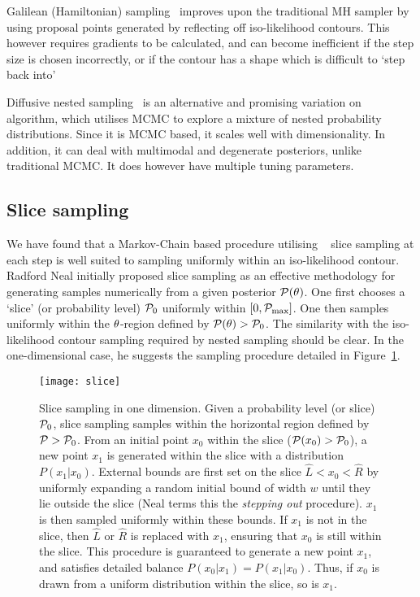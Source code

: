 Galilean (Hamiltonian) sampling~\citep{GalileanNestedSampling,Betancourt2011} improves upon the traditional MH sampler by using proposal points generated by reflecting off iso-likelihood contours. This however requires gradients to be calculated, and can become inefficient if the step size is chosen incorrectly, or if the contour has a shape which is difficult to `step back into'

Diffusive nested sampling~\citep{DiffusiveNestedSampling} is an alternative and promising variation on~ algorithm, which utilises MCMC to explore a mixture of nested probability distributions. Since it is MCMC based, it scales well with dimensionality. In addition, it can deal with multimodal and degenerate posteriors, unlike traditional MCMC\@. It does however have multiple tuning parameters.


\subsection{Slice sampling}
\label{sec:pc:slice_sampling}
We have found that a Markov-Chain based procedure utilising ~ slice sampling at each step is well suited to sampling uniformly within an iso-likelihood contour.
Radford Neal initially proposed slice sampling as an effective methodology for generating samples numerically from a given posterior $\mathcal{P}(\theta)$. One first chooses a `slice' (or probability level) $\mathcal{P}_0$ uniformly within $[0,\mathcal{P}_{\mathrm{max}}]$. One then samples uniformly within the $\theta$-region defined by $\mathcal{P}(\theta)>\mathcal{P}_0$. The similarity with the iso-likelihood contour sampling required by nested sampling should be clear. In the one-dimensional case, he suggests the sampling procedure detailed in Figure~\ref{fig:pc:1d_slice}.

\begin{figure}
  \centerline{%
    \texttt{[image: slice]}
  }

  \caption{Slice sampling in one dimension. 
    Given a probability level (or slice) $\mathcal{P}_0$, slice sampling samples within the horizontal region defined by $\mathcal{P}>\mathcal{P}_0$. 
    From an initial point $x_0$ within the slice ($\mathcal{P}(x_0)>\mathcal{P}_0$), a new point $x_1$ is generated within the slice with a distribution $P(x_1|x_0)$.
    External bounds are first set on the slice $\hat{L}<x_0<\hat{R}$ by uniformly expanding a random initial bound of width $w$ until they lie outside the slice (Neal terms this the {\em stepping out\/} procedure). 
    $x_1$ is then sampled uniformly within these bounds.  
    If $x_1$ is not in the slice, then $\hat{L}$ or $\hat{R}$ is replaced with $x_1$, ensuring that $x_0$ is still within the slice.
    This procedure is guaranteed to generate a new point $x_1$, and satisfies detailed balance $P(x_0|x_1) = P(x_1|x_0)$. Thus, if $x_0$ is drawn from a uniform distribution within the slice, so is $x_1$.\label{fig:pc:1d_slice}
  }
\end{figure}


